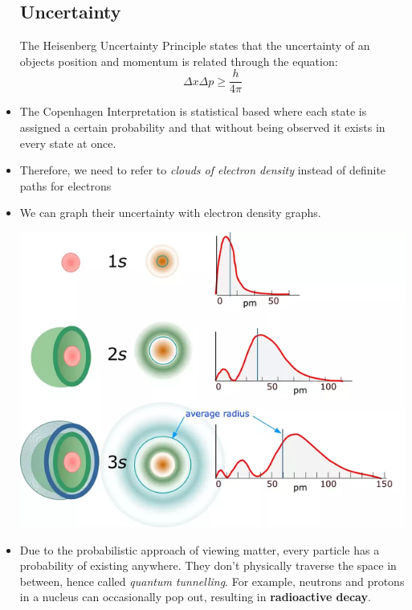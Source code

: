 \documentclass{article}
\numberwithin{equation}{section}
\theoremstyle{classic}
\begin{document}
\begin{itemize}
    \subsection{Uncertainty}
    \begin{idea}
        The Heisenberg Uncertainty Principle states that the uncertainty of an objects position and momentum is related through the equation:
        \begin{equation}
            \Delta x \Delta p \ge \frac{h}{4\pi}
        \end{equation}
    \end{idea}
    \item The Copenhagen Interpretation is statistical based where each state is assigned a certain probability and that without being observed it exists in every state at once.
    \item Therefore, we need to refer to \textit{clouds of electron density} instead of definite paths for electrons
    \item We can graph their uncertainty with electron density graphs.
    \begin{center}\includegraphics[width=0.5\linewidth]{Q2-TEMP.PNG}\end{center}
    \item Due to the probabilistic approach of viewing matter, every particle has a probability of existing anywhere. They don't physically traverse the space in between, hence called \textit{quantum tunnelling}. For example, neutrons and protons in a nucleus can occasionally pop out, resulting in \textbf{radioactive decay}.

\end{itemize}
\end{document}
